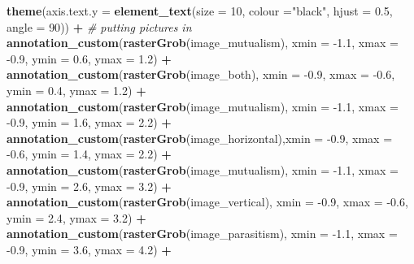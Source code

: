 \documentclass[
]{article}
\newenvironment{Shaded}{\begin{snugshade}}{\end{snugshade}}
\newcommand{\CommentTok}[1]{\textcolor[rgb]{0.56,0.35,0.01}{\textit{#1}}}
\newcommand{\DataTypeTok}[1]{\textcolor[rgb]{0.13,0.29,0.53}{#1}}
\newcommand{\DecValTok}[1]{\textcolor[rgb]{0.00,0.00,0.81}{#1}}
\newcommand{\FloatTok}[1]{\textcolor[rgb]{0.00,0.00,0.81}{#1}}
\newcommand{\KeywordTok}[1]{\textcolor[rgb]{0.13,0.29,0.53}{\textbf{#1}}}
\newcommand{\NormalTok}[1]{#1}
\newcommand{\OperatorTok}[1]{\textcolor[rgb]{0.81,0.36,0.00}{\textbf{#1}}}
\newcommand{\StringTok}[1]{\textcolor[rgb]{0.31,0.60,0.02}{#1}}
\begin{document}
\begin{Shaded}
\begin{Highlighting}[]
{{{{{\StringTok{  }\KeywordTok{theme}\NormalTok{(}\DataTypeTok{axis.text.y =} \KeywordTok{element_text}\NormalTok{(}\DataTypeTok{size =} \DecValTok{10}\NormalTok{, }\DataTypeTok{colour =}\StringTok{"black"}\NormalTok{, }\DataTypeTok{hjust =} \FloatTok{0.5}\NormalTok{, }\DataTypeTok{angle =} \DecValTok{90}\NormalTok{)) }\OperatorTok{+}
\StringTok{  }\CommentTok{# putting pictures in}
\StringTok{  }\KeywordTok{annotation_custom}\NormalTok{(}\KeywordTok{rasterGrob}\NormalTok{(image_mutualism), }\DataTypeTok{xmin =} \FloatTok{-1.1}\NormalTok{, }\DataTypeTok{xmax =} \FloatTok{-0.9}\NormalTok{, }\DataTypeTok{ymin =} \FloatTok{0.6}\NormalTok{, }\DataTypeTok{ymax =} \FloatTok{1.2}\NormalTok{) }\OperatorTok{+}\StringTok{ }
\StringTok{  }\KeywordTok{annotation_custom}\NormalTok{(}\KeywordTok{rasterGrob}\NormalTok{(image_both), }\DataTypeTok{xmin =} \FloatTok{-0.9}\NormalTok{, }\DataTypeTok{xmax =} \FloatTok{-0.6}\NormalTok{, }\DataTypeTok{ymin =} \FloatTok{0.4}\NormalTok{, }\DataTypeTok{ymax =} \FloatTok{1.2}\NormalTok{) }\OperatorTok{+}\StringTok{ }
\StringTok{  }\KeywordTok{annotation_custom}\NormalTok{(}\KeywordTok{rasterGrob}\NormalTok{(image_mutualism), }\DataTypeTok{xmin =} \FloatTok{-1.1}\NormalTok{, }\DataTypeTok{xmax =} \FloatTok{-0.9}\NormalTok{, }\DataTypeTok{ymin =} \FloatTok{1.6}\NormalTok{, }\DataTypeTok{ymax =} \FloatTok{2.2}\NormalTok{) }\OperatorTok{+}
\StringTok{  }\KeywordTok{annotation_custom}\NormalTok{(}\KeywordTok{rasterGrob}\NormalTok{(image_horizontal),}\DataTypeTok{xmin =} \FloatTok{-0.9}\NormalTok{, }\DataTypeTok{xmax =} \FloatTok{-0.6}\NormalTok{, }\DataTypeTok{ymin =} \FloatTok{1.4}\NormalTok{, }\DataTypeTok{ymax =} \FloatTok{2.2}\NormalTok{) }\OperatorTok{+}
\StringTok{  }\KeywordTok{annotation_custom}\NormalTok{(}\KeywordTok{rasterGrob}\NormalTok{(image_mutualism), }\DataTypeTok{xmin =} \FloatTok{-1.1}\NormalTok{, }\DataTypeTok{xmax =} \FloatTok{-0.9}\NormalTok{, }\DataTypeTok{ymin =} \FloatTok{2.6}\NormalTok{, }\DataTypeTok{ymax =} \FloatTok{3.2}\NormalTok{) }\OperatorTok{+}\StringTok{ }
\StringTok{  }\KeywordTok{annotation_custom}\NormalTok{(}\KeywordTok{rasterGrob}\NormalTok{(image_vertical), }\DataTypeTok{xmin =} \FloatTok{-0.9}\NormalTok{, }\DataTypeTok{xmax =} \FloatTok{-0.6}\NormalTok{, }\DataTypeTok{ymin =} \FloatTok{2.4}\NormalTok{, }\DataTypeTok{ymax =} \FloatTok{3.2}\NormalTok{) }\OperatorTok{+}\StringTok{ }
\StringTok{  }\KeywordTok{annotation_custom}\NormalTok{(}\KeywordTok{rasterGrob}\NormalTok{(image_parasitism), }\DataTypeTok{xmin =} \FloatTok{-1.1}\NormalTok{, }\DataTypeTok{xmax =} \FloatTok{-0.9}\NormalTok{, }\DataTypeTok{ymin =} \FloatTok{3.6}\NormalTok{, }\DataTypeTok{ymax =} \FloatTok{4.2}\NormalTok{) }\OperatorTok{+}
}}}}}
\end{Highlighting}
\end{Shaded}
\end{document}
